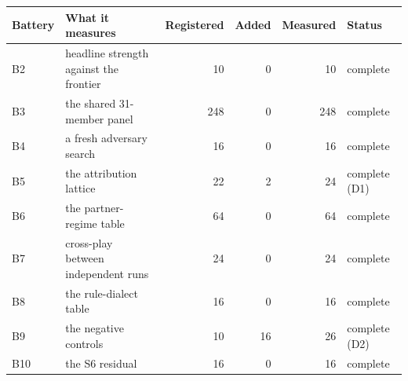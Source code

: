 \begin{tabularx}{\linewidth}{@{}l L r r r l@{}}
\toprule
Battery & What it measures & Registered & Added & Measured & Status \\
\midrule
B2 & headline strength against the frontier & 10 & 0 & 10 & complete \\
B3 & the shared 31-member panel & 248 & 0 & 248 & complete \\
B4 & a fresh adversary search & 16 & 0 & 16 & complete \\
B5 & the attribution lattice & 22 & 2 & 24 & complete (D1) \\
B6 & the partner-regime table & 64 & 0 & 64 & complete \\
B7 & cross-play between independent runs & 24 & 0 & 24 & complete \\
B8 & the rule-dialect table & 16 & 0 & 16 & complete \\
B9 & the negative controls & 10 & 16 & 26 & complete (D2) \\
B10 & the S6 residual & 16 & 0 & 16 & complete \\
\bottomrule
\end{tabularx}
